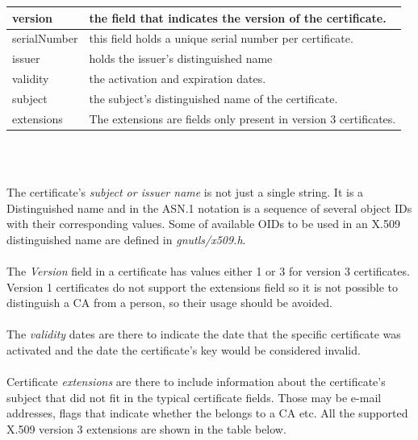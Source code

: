 \label{fig:x509}
\begin{tabular}{|l||l|}
\hline
version & the field that indicates the version of the certificate.
\\
\hline
serialNumber & this field holds a unique serial number per certificate.
\\
\hline
issuer & holds the issuer's distinguished name
\\
\hline
validity & the activation and expiration dates.
\\
\hline
subject & the subject's distinguished name of the certificate.
\\
\hline
\rowcolor[gray]{0.9}
extensions & The extensions are fields only present in version 3 certificates.
\\
\hline
\end{tabular}
\\
\\
\par
The certificate's \emph{subject or issuer name} is not just a single string. It is
a Distinguished name and in the ASN.1 notation is a sequence of several object
IDs with their corresponding values. Some of available OIDs to be used in an X.509
distinguished name are defined in \emph{gnutls/x509.h}.
\\
\\
The \emph{Version} field in a certificate has values either 1 or 3 for version 3 certificates.
Version 1 certificates do not support the extensions field so it is not possible
to distinguish a CA from a person, so their usage should be avoided.
\\
\\
The \emph{validity} dates are there to indicate the date that the specific certificate
was activated and the date the certificate's key would be considered invalid.
\\
\\
Certificate \emph{extensions} are there to include information about the certificate's
subject that did not fit in the typical certificate fields. Those may be
e-mail addresses, flags that indicate whether the belongs to a CA etc.
All the supported X.509 version 3 extensions are shown in the table below.

